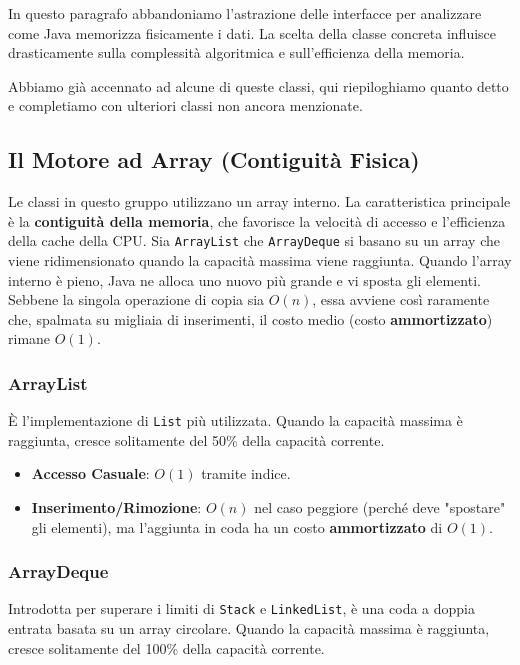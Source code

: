 In questo paragrafo abbandoniamo l'astrazione delle interfacce per analizzare come Java memorizza fisicamente i dati. La scelta della classe concreta influisce drasticamente sulla complessità algoritmica e sull'efficienza della memoria.

Abbiamo già accennato ad alcune di queste classi, qui riepiloghiamo quanto detto e completiamo con ulteriori classi non ancora menzionate.

\subsection{Il Motore ad Array (Contiguità Fisica)}

Le classi in questo gruppo utilizzano un array interno. La caratteristica principale è la \textbf{contiguità della memoria}, che favorisce la velocità di accesso e l'efficienza della cache della CPU. Sia \texttt{ArrayList} che \texttt{ArrayDeque} si basano su un array che viene ridimensionato quando la capacità massima viene raggiunta. Quando l'array interno è pieno, Java ne alloca uno nuovo più grande e vi sposta gli elementi. Sebbene la singola operazione di copia sia $O(n)$, essa avviene così raramente che, spalmata su migliaia di inserimenti, il costo medio (costo \textbf{ammortizzato}) rimane $O(1)$.

\subsubsection*{ArrayList}
È l'implementazione di \texttt{List} più utilizzata. Quando la capacità massima è raggiunta, cresce solitamente del 50\% della capacità corrente.

\begin{itemize}
    \item \textbf{Accesso Casuale}: $O(1)$ tramite indice.
    \item \textbf{Inserimento/Rimozione}: $O(n)$ nel caso peggiore (perché deve "spostare" gli elementi), ma l'aggiunta in coda ha un costo \textbf{ammortizzato} di $O(1)$.
\end{itemize}


\subsubsection*{ArrayDeque}
Introdotta per superare i limiti di \texttt{Stack} e \texttt{LinkedList}, è una coda a doppia entrata basata su un array circolare. Quando la capacità massima è raggiunta, cresce solitamente del 100\% della capacità corrente.


